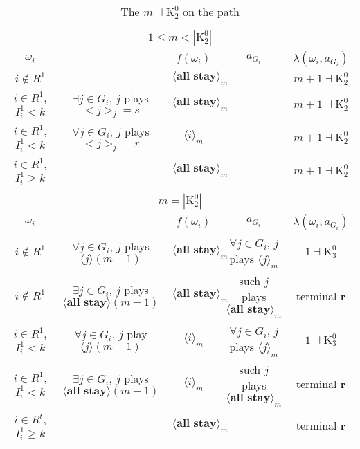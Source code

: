 \documentclass[12pt,letter]{article}
\newcommand{\Kappa}{\mathrm{K}}
\theoremstyle{definition}
\theoremstyle{remark}
\theoremstyle{claim}
\begin{document}
\begin{landscape}
\begin{table}[!htbp]
\caption{The $m\dashv\Kappa^0_{2}$ on the path}
\label{table:eqm_path_k02}
\begin{center}
\begin{tabular}{c c | c | c | c}
\multicolumn{5}{c}{$1\leq m < |\Kappa^0_2|$}\\
$\omega_i$ 	 & 	   &	$f(\omega_i)$  &	$a_{G_i}$ & $\lambda(\omega_i,a_{G_i})$ \\
\hline
\hline
$i\notin R^1$  	& & $\langle \textbf{all stay} \rangle_m$	&    & $m+1\dashv \Kappa^0_{2}$\\
$i\in R^1$, $I^1_i< k$  	& $\exists j\in G_i$, $j$ plays $<j>_j=s$	& $\langle \textbf{all stay} \rangle_m$	& 	& $m+1\dashv \Kappa^0_{2}$\\
$i\in R^1$, $I^1_i< k$  	& $\forall j\in G_i$, $j$ plays $<j>_j=r$ 	& $\langle i \rangle_m$	& 	& $m+1\dashv \Kappa^0_{2}$\\
$i\in R^1$, $I^1_i\geq k$  	& 	& $\langle \textbf{all stay} \rangle_m$	&	& $m+1\dashv \Kappa^0_{2}$\\
\hline
\\
\multicolumn{5}{c}{$m= |\Kappa^0_2|$}\\
$\omega_i$ 	 & 	   &	$f(\omega_i)$  &	$a_{G_i}$ & $\lambda(\omega_i,a_{G_i})$ \\
\hline
\hline
$i\notin R^1$  	& $\forall j\in G_i$, $j$ plays $\langle j \rangle(m-1)$    & $\langle \textbf{all stay} \rangle_m$	& $\forall j\in G_i$, $j$ plays $\langle j \rangle_m$	& $1\dashv \Kappa^0_{3}$\\
$i\notin R^1$  	& $\exists j\in G_i$, $j$ plays $\langle \textbf{all stay} \rangle(m-1)$   & $\langle \textbf{all stay} \rangle_m$	& such $j$ plays $\langle \textbf{all stay} \rangle_m$	& terminal \textbf{r}\\
$i\in R^1$, $I^1_i< k$   	& $\forall j\in G_i$, $j$ play $\langle j \rangle(m-1)$ 	& $\langle i \rangle_m$	&  $\forall j\in G_i$, $j$ plays $\langle j \rangle_m$	& $1\dashv \Kappa^0_{3}$ \\
$i\in R^1$, $I^1_i< k$   	&  $\exists j\in G_i$, $j$ plays $\langle \textbf{all stay} \rangle(m-1)$ 	& $\langle i \rangle_m$	& such $j$ plays $\langle \textbf{all stay} \rangle_m$	&  terminal \textbf{r}\\
$i\in R^t$, $I^1_i\geq k$  	& 	& $\langle \textbf{all stay} \rangle_m$	& 	& terminal \textbf{r} \\
\hline
\end{tabular}
\end{center}
\end{table}

\end{landscape}
\end{document}
